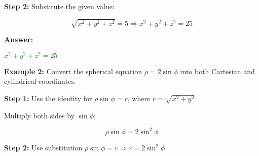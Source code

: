 \documentclass[10pt]{article}                               %
\begin{document}
\begin{adjustwidth}{2em}{0pt}
\begin{adjustwidth}{2em}{0pt}
\begin{examplebox}
\begin{adjustwidth}{2em}{0pt}
                    \vspace{0.5em}
            
                    \textbf{Step 2:} Substitute the given value:
            
                    \vspace{0.25em}
            
                    \[ \sqrt{x^2 + y^2 + z^2} = 5 \Rightarrow x^2 + y^2 + z^2 = 25 \]
            
                    \vspace{0.5em}
            
                    \textbf{Answer:}
            
                    \vspace{0.25em}
            
                    \textcolor{darkgreen}{\( x^2 + y^2 + z^2 = 25 \)}
            
                \end{adjustwidth}

                \vspace{0.5em}

                \textbf{Example 2:} Convert the spherical equation \( \rho = 2\sin\phi \) into both Cartesian and cylindrical coordinates.

                \vspace{0.5em}

                \begin{adjustwidth}{2em}{0pt}
                
                    \textbf{Step 1:} Use the identity for \( \rho \sin\phi = r \), where \( r = \sqrt{x^2 + y^2} \)
                
                    \vspace{0.25em}

                    Multiply both sides by \( \sin\phi \):
                
                    \[
                    \rho \sin\phi = 2\sin^2\phi
                    \]
                
                    \vspace{0.5em}
                
                    \textbf{Step 2:} Use substitution \( \rho \sin\phi = r \Rightarrow r = 2\sin^2\phi \)
                
                    \vspace{0.25em}
                

\end{adjustwidth}
\end{examplebox}
\end{adjustwidth}
\end{adjustwidth}
\end{document}
